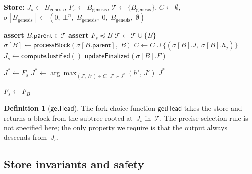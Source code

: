 \ifx\litemode\undefined\documentclass{article}\fi
\newcommand{\parent}{\mathsf{parent}}
\theoremstyle{plain}
\theoremstyle{definition}
\newtheorem{definition}[theorem]{Definition}
\theoremstyle{remark}
\begin{document}
\begin{center}
\begin{boxedminipage}{\textwidth}
\begin{algorithmic}[1]

\State \textbf{Store:} $J_s \gets B_{\mathrm{genesis}}$, \; $F_s \gets B_{\mathrm{genesis}}$, \; $\mathcal{T} \gets \{B_{\mathrm{genesis}}\}$, \; $C \gets \emptyset$, \; $\sigma[B_{\mathrm{genesis}}] \gets (0,\; \bot^n,\; B_{\mathrm{genesis}},\; 0,\; B_{\mathrm{genesis}},\; \emptyset)$
\vspace{3pt}

  \State \textbf{assert} $B.\parent \in \mathcal{T}$ 
  \State \textbf{assert} $F_s \preceq B$ 
  \State $\mathcal{T} \gets \mathcal{T} \cup \{B\}$
  \State $\sigma[B] \gets \textsf{processBlock}(\sigma[B.\parent],\; B)$
  \State $C \gets C \cup \{(\sigma[B].J,\; \sigma[B].h_j)\}$
  \State $J_s \gets \textsf{computeJustified}()$
  \State $\textsf{updateFinalized}(\sigma[B].F)$
\EndFunction
\vspace{3pt}

  \State $J^* \gets F_s$
   
    \State $J^* \gets \arg\max_{(J',\, h') \in C,\; J' \succ J^*} (h',\, J')$
  \EndWhile
  \State \Return $J^*$
\EndFunction
\vspace{3pt}

    \State $F_s \gets F_B$
  \EndIf
\EndFunction

\end{algorithmic}
\end{boxedminipage}
\end{center}

\begin{definition}[$\textsf{getHead}$]\label{def:gethead}
The fork-choice function $\textsf{getHead}$ takes the store and returns a block from the subtree rooted at~$J_s$ in~$\mathcal{T}$.
The precise selection rule is not specified here; the only property we require is that the output always descends from~$J_s$.
\end{definition}

\subsection{Store invariants and safety}
\end{document}
